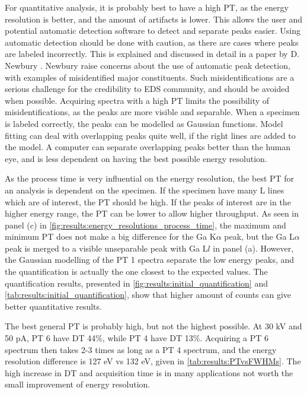 For quantitative analysis, it is probably best to have a high PT, as the energy resolution is better, and the amount of artifacts is lower.
This allows the user and potential automatic detection software to detect and separate peaks easier.
Using automatic detection should be done with caution, as there are cases where peaks are labeled incorrectly.
This is explained and discussed in detail in a paper by D. Newbury \cite{newbury_2005_misidentification}.
Newbury raise concerns about the use of automatic peak detection, with examples of misidentified major constituents.
Such misidentifications are a serious challenge for the credibility to EDS community, and should be avoided when possible.
Acquiring spectra with a high PT limits the possibility of misidentifications, as the peaks are more visible and separable.
When a specimen is labeled correctly, the peaks can be modelled as Gaussian functions.
Model fitting can deal with overlapping peaks quite well, if the right lines are added to the model.
A computer can separate overlapping peaks better than the human eye, and is less dependent on having the best possible energy resolution.


As the process time is very influential on the energy resolution, the best PT for an analysis is dependent on the specimen.
If the specimen have many L lines which are of interest, the PT should be high.
If the peaks of interest are in the higher energy range, the PT can be lower to allow higher throughput.
As seen in panel (c) in \cref{fig:results:energy_resolutions_process_time}, the maximum and minimum PT does not make a big difference for the Ga K$\alpha$ peak, but the Ga L$\alpha$ peak is merged to a visible unseparable peak with Ga L$l$ in panel (a).
However, the Gaussian modelling of the PT 1 spectra separate the low energy peaks, and the quantification is actually the one closest to the expected values.
The quantification results, presented in \cref{fig:results:initial_quantification} and \cref{tab:results:initial_quantification}, show that higher amount of counts can give better quantitative results.


The best general PT is probably high, but not the highest possible.
At 30 kV and 50 pA, PT 6 have DT 44\%, while PT 4 have DT 13\%.
Acquiring a PT 6 spectrum then takes 2-3 times as long as a PT 4 spectrum, and the energy resolution difference is 127 eV vs 132 eV, given in \cref{tab:results:PTvsFWHMs}.
The high increase in DT and acquisition time is in many applications not worth the small improvement of energy resolution.



